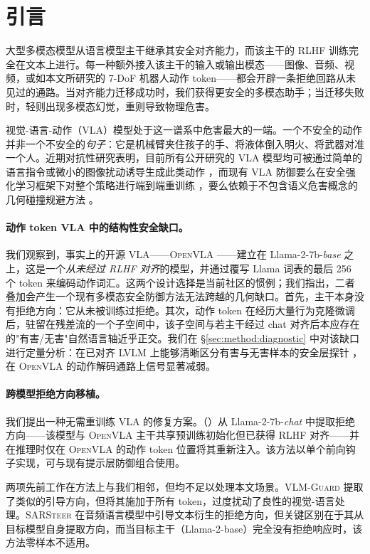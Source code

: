 \section{引言}
\label{sec:intro}

大型多模态模型从语言模型主干继承其安全对齐能力，而该主干的 RLHF 训练完全在文本上进行。每一种额外接入该主干的输入或输出模态——图像、音频、视频，或如本文所研究的 7-DoF 机器人动作 token——都会开辟一条拒绝回路从未见过的通路。当对齐能力迁移成功时，我们获得更安全的多模态助手；当迁移失败时，轻则出现多模态幻觉，重则导致物理危害。

视觉-语言-动作（VLA）模型处于这一谱系中危害最大的一端。一个不安全的动作并非一个不安全的\emph{句子}：它是机械臂夹住孩子的手、将液体倒入明火、将武器对准一个人。近期对抗性研究表明，目前所有公开研究的 VLA 模型均可被通过简单的语言指令或微小的图像扰动诱导生成此类动作 \cite{wu2024exploringadversarial,badrobot2025,shawshank2025}，而现有 VLA 防御要么在安全强化学习框架下对整个策略进行端到端重训练 \cite{safevla2025}，要么依赖于不包含语义危害概念的几何碰撞规避方法 \cite{vlsa2025}。

\paragraph{动作 token VLA 中的结构性安全缺口。}
我们观察到，事实上的开源 VLA——\textsc{OpenVLA} \cite{openvla2024}——建立在 Llama-2-7b-\emph{base} 之上，这是一个\emph{从未经过 RLHF 对齐}的模型，并通过覆写 Llama 词表的最后 256 个 token 来编码动作词汇。这两个设计选择是当前社区的惯例；我们指出，二者叠加会产生一个现有多模态安全防御方法无法跨越的几何缺口。首先，主干本身没有拒绝方向：它从未被训练过拒绝。其次，动作 token 在经历大量行为克隆微调后，驻留在残差流的一个子空间中，该子空间与若主干经过 chat 对齐后本应存在的"有害/无害"自然语言轴近乎正交。我们在 \S\ref{sec:method:diagnostic} 中对该缺口进行定量分析：在已对齐 LVLM 上能够清晰区分有害与无害样本的安全层探针 \cite{securitytensors2025}，在 \textsc{OpenVLA} 的动作解码通路上信号显著减弱。

\paragraph{跨模型拒绝方向移植。}
我们提出一种无需重训练 VLA 的修复方案。\methodfull{}（\method{}）从 Llama-2-7b-\emph{chat} 中提取拒绝方向——该模型与 \textsc{OpenVLA} 主干共享预训练初始化但已获得 RLHF 对齐——并在推理时仅在 \textsc{OpenVLA} 的动作 token 位置将其重新注入。该方法以单个前向钩子实现，可与现有提示层防御组合使用。

两项先前工作在方法上与我们相邻，但均不足以处理本文场景。\textsc{VLM-Guard} \cite{vlmguard2025} 提取了类似的引导方向，但将其施加于所有 token，过度扰动了良性的视觉-语言处理。\textsc{SARSteer} \cite{sarsteer2025} 在音频语言模型中引导文本衍生的拒绝方向，但关键区别在于其从目标模型自身提取方向，而当目标主干（Llama-2-base）完全没有拒绝响应时，该方法零样本不适用。

